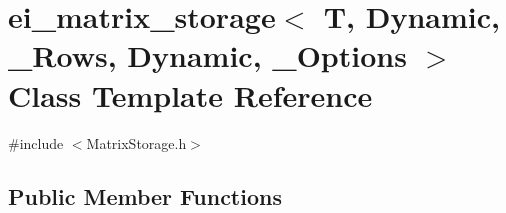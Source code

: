 \hypertarget{classei__matrix__storage_3_01_t_00_01_dynamic_00_01___rows_00_01_dynamic_00_01___options_01_4}{\section{ei\-\_\-matrix\-\_\-storage$<$ T, Dynamic, \-\_\-\-Rows, Dynamic, \-\_\-\-Options $>$ Class Template Reference}
\label{classei__matrix__storage_3_01_t_00_01_dynamic_00_01___rows_00_01_dynamic_00_01___options_01_4}
}


{\ttfamily \#include $<$Matrix\-Storage.\-h$>$}

\subsection*{Public Member Functions}
